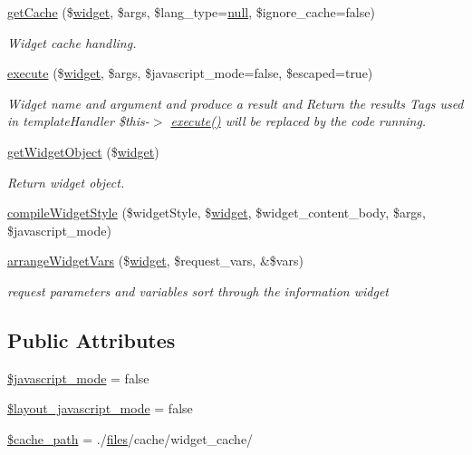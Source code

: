\begin{DoxyCompactItemize}
\hyperlink{classwidgetController_ad866136705c196f9b7b231f58be317eb}{get\+Cache} (\$\hyperlink{classwidget}{widget}, \$args, \$lang\+\_\+type=\hyperlink{modernizr_8min_8js_a286f9ec831c5e676eeb493248eab9575}{null}, \$ignore\+\_\+cache=false)
\begin{DoxyCompactList}\small\item\em Widget cache handling. \end{DoxyCompactList}\item 
\hyperlink{classwidgetController_a8344d21b83ae400500e70f371817a8d9}{execute} (\$\hyperlink{classwidget}{widget}, \$args, \$javascript\+\_\+mode=false, \$escaped=true)
\begin{DoxyCompactList}\small\item\em Widget name and argument and produce a result and Return the results Tags used in template\+Handler \$this-\/$>$ \hyperlink{classwidgetController_a8344d21b83ae400500e70f371817a8d9}{execute()} will be replaced by the code running. \end{DoxyCompactList}\item 
\hyperlink{classwidgetController_a15059522aa8548d03668025d20d6d152}{get\+Widget\+Object} (\$\hyperlink{classwidget}{widget})
\begin{DoxyCompactList}\small\item\em Return widget object. \end{DoxyCompactList}\item 
\hyperlink{classwidgetController_ad399f4e9088de6b63e479bfd68c1f2a0}{compile\+Widget\+Style} (\$widget\+Style, \$\hyperlink{classwidget}{widget}, \$widget\+\_\+content\+\_\+body, \$args, \$javascript\+\_\+mode)
\item 
\hyperlink{classwidgetController_a7f852fc1f0b521ff574f85ee067173ce}{arrange\+Widget\+Vars} (\$\hyperlink{classwidget}{widget}, \$request\+\_\+vars, \&\$vars)
\begin{DoxyCompactList}\small\item\em request parameters and variables sort through the information widget \end{DoxyCompactList}\end{DoxyCompactItemize}
\subsection*{Public Attributes}
\begin{DoxyCompactItemize}
\item 
\hyperlink{classwidgetController_a9879a9de581b205ffa63cc0297dcefab}{\$javascript\+\_\+mode} = false
\item 
\hyperlink{classwidgetController_ab123ebb549e616c6e67bf79e73f56ac8}{\$layout\+\_\+javascript\+\_\+mode} = false
\item 
\hyperlink{classwidgetController_a279375b189444d13250d8111910655c3}{\$cache\+\_\+path} = \textquotesingle{}./\hyperlink{popup_8min_8js_a0742cac2750bccc2d88ac080fb9daa22}{files}/cache/widget\+\_\+cache/\textquotesingle{}
\end{DoxyCompactItemize}


